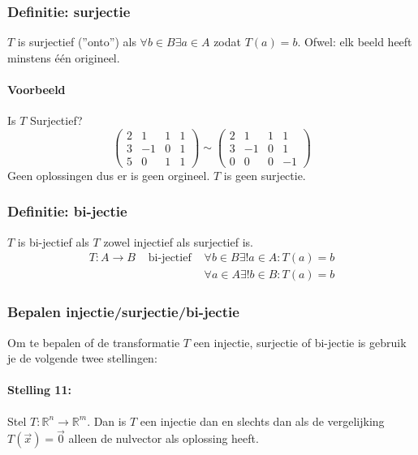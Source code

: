 \subsubsection{Definitie: surjectie}
$T$ is surjectief (''onto'') als $\forall b \in B \exists a \in A$ zodat $T(a) = b$. Ofwel: elk beeld heeft minstens \'e\'en origineel.

\paragraph{Voorbeeld} Is $T$ Surjectief?
\[ \left(\!\begin{array}{rrr|r}
	2 & 1& 1 & 1 \\
	3 & -1 & 0 & 1 \\
	5 & 0 & 1 & 1
\end{array}\!\right) \sim \left(\!\begin{array}{rrr|r}
	2 & 1 & 1 & 1 \\
	3 & -1 & 0 & 1 \\
	0 & 0 & 0 & -1
\end{array} \!\right) \]
Geen oplossingen dus er is geen orgineel. $T$ is geen surjectie.

\subsubsection{Definitie: bi-jectie}
$T$ is bi-jectief als $T$ zowel injectief als surjectief is.
\begin{eqnarray*}
T: A \to B &\mbox{ bi-jectief }& \forall b \in B \exists ! a \in A: T(a) = b \\
&& \forall a \in A \exists ! b \in B: T(a) = b
\end{eqnarray*}

\subsubsection{Bepalen injectie/surjectie/bi-jectie}
Om te bepalen of de transformatie $T$ een injectie, surjectie of bi-jectie is gebruik je de volgende twee stellingen:

\paragraph{Stelling 11:}  Stel $T: \mathbb{R}^n \to \mathbb{R}^m$. Dan is $T$ een injectie dan en slechts dan als de vergelijking $T(\vec{x}) = \vec{0}$ alleen de nulvector als oplossing heeft.

